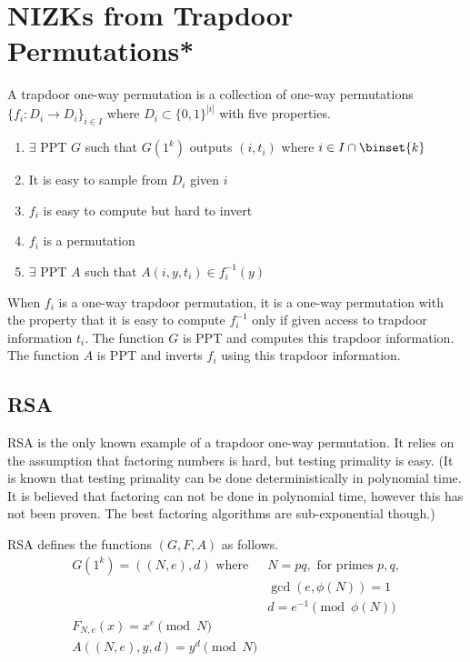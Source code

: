 \section{NIZKs from Trapdoor Permutations*}

\begin{definition}
A trapdoor one-way permutation is a collection of one-way permutations $\{f_i : D_i \rightarrow D_i\}_{i \in I}$ where $D_i \subset \{0,1\}^{|i|}$ with
five properties.

\begin{enumerate}
\item $\exists$ PPT $G$ such that $G(1^k)$ outputs $(i,t_i)$ where $i \in I\cap \binset{k}$
\item It is easy to sample from $D_i$ given $i$ 
\item $f_i$ is easy to compute but hard to invert
\item  $f_i$ is a permutation
\item $\exists$ PPT $A$ such that $A(i, y, t_i)\in f_i^{-1}(y)$
\end{enumerate}
\end{definition}

When $f_i$ is a one-way trapdoor permutation, it is a one-way permutation with
the property that it is easy to compute $f_i^{-1}$ only if given access to trapdoor
information $t_i$. The function $G$ is PPT and computes this trapdoor information.
The function $A$ is PPT and inverts $f_i$ using this trapdoor information.

\subsection{RSA}

RSA is the only known example of a trapdoor one-way permutation.
It relies on the assumption that factoring numbers is hard,
but testing primality is easy. (It is known that testing primality can be done
deterministically in polynomial time. It is believed that factoring can not be done in
polynomial time, however this has not been proven. The best factoring algorithms
are sub-exponential though.)

\begin{definition}
RSA defines the functions $(G, F, A)$ as follows.
\begin{align*}
G(1^k) = ((N, e), d) \,\,\text{where} \,\,& N=pq, \,\, \text{for primes $p,q$},  \\
& \gcd(e,\phi(N))=1 \\
& d = e^{-1} \pmod{\phi(N)} \\
F_{N,e}(x) = x^e \pmod{N} & \\
A((N,e),y, d) = y^d \pmod{N} &
\end{align*}
\end{definition}

